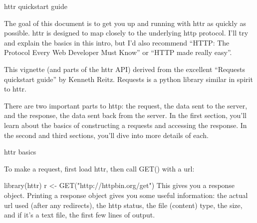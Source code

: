 httr quickstart guide

The goal of this document is to get you up and running with httr as quickly as possible. httr is designed to map closely to the underlying http protocol. I'll try and explain the basics in this intro, but I'd also recommend “HTTP: The Protocol Every Web Developer Must Know” or “HTTP made really easy”.

This vignette (and parts of the httr API) derived from the excellent “Requests quickstart guide” by Kenneth Reitz. Requests is a python library similar in spirit to httr.

There are two important parts to http: the request, the data sent to the server, and the response, the data sent back from the server. In the first section, you'll learn about the basics of constructing a requests and accessing the response. In the second and third sections, you'll dive into more details of each.

httr basics

To make a request, first load httr, then call GET() with a url:

library(httr)
r <- GET("http://httpbin.org/get")
This gives you a response object. Printing a response object gives you some useful information: the actual url used (after any redirects), the http status, the file (content) type, the size, and if it's a text file, the first few lines of output.

